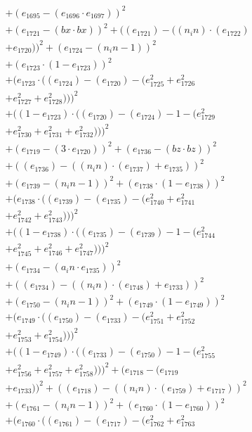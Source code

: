 \documentclass[10pt, a4paper]{article}
\begin{document}
\begin{align*}
& + (e_{1695} - (e_{1696}  \cdot  e_{1697}))^{2} \\
& + (e_{1721} - (bx  \cdot  bx))^{2} + ((e_{1721}) - ((n_in)  \cdot  (e_{1722}) \\
& + e_{1720}))^{2} + (e_{1724} - (n_in - 1))^{2} \\
& + (e_{1723}  \cdot  (1 - e_{1723}))^{2} \\
& + (e_{1723}  \cdot  ((e_{1724}) - (e_{1720}) - (e_{1725}^{2} + e_{1726}^{2} \\
& + e_{1727}^{2} + e_{1728}^{2})))^{2} \\
& + ((1 - e_{1723})  \cdot  ((e_{1720}) - (e_{1724}) - 1 - (e_{1729}^{2} \\
& + e_{1730}^{2} + e_{1731}^{2} + e_{1732}^{2})))^{2} \\
& + (e_{1719} - (3  \cdot  e_{1720}))^{2} + (e_{1736} - (bz  \cdot  bz))^{2} \\
& + ((e_{1736}) - ((n_in)  \cdot  (e_{1737}) + e_{1735}))^{2} \\
& + (e_{1739} - (n_in - 1))^{2} + (e_{1738}  \cdot  (1 - e_{1738}))^{2} \\
& + (e_{1738}  \cdot  ((e_{1739}) - (e_{1735}) - (e_{1740}^{2} + e_{1741}^{2} \\
& + e_{1742}^{2} + e_{1743}^{2})))^{2} \\
& + ((1 - e_{1738})  \cdot  ((e_{1735}) - (e_{1739}) - 1 - (e_{1744}^{2} \\
& + e_{1745}^{2} + e_{1746}^{2} + e_{1747}^{2})))^{2} \\
& + (e_{1734} - (a_in  \cdot  e_{1735}))^{2} \\
& + ((e_{1734}) - ((n_in)  \cdot  (e_{1748}) + e_{1733}))^{2} \\
& + (e_{1750} - (n_in - 1))^{2} + (e_{1749}  \cdot  (1 - e_{1749}))^{2} \\
& + (e_{1749}  \cdot  ((e_{1750}) - (e_{1733}) - (e_{1751}^{2} + e_{1752}^{2} \\
& + e_{1753}^{2} + e_{1754}^{2})))^{2} \\
& + ((1 - e_{1749})  \cdot  ((e_{1733}) - (e_{1750}) - 1 - (e_{1755}^{2} \\
& + e_{1756}^{2} + e_{1757}^{2} + e_{1758}^{2})))^{2} + (e_{1718} - (e_{1719} \\
& + e_{1733}))^{2} + ((e_{1718}) - ((n_in)  \cdot  (e_{1759}) + e_{1717}))^{2} \\
& + (e_{1761} - (n_in - 1))^{2} + (e_{1760}  \cdot  (1 - e_{1760}))^{2} \\
& + (e_{1760}  \cdot  ((e_{1761}) - (e_{1717}) - (e_{1762}^{2} + e_{1763}^{2} \\

\end{align*}
\end{document}
